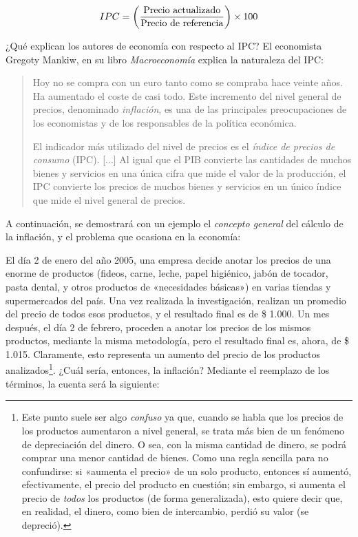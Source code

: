 \documentclass[12pt,a4paper,twoside]{book}
\begin{document}
\begin{equation}
IPC = \left( \dfrac{\text{Precio actualizado}}{\text{Precio de referencia}} \right) \times 100 \\
\end{equation}

¿Qué explican los autores de economía con respecto al IPC? El economista Gregoty Mankiw, en su libro \textit{Macroeconomía} explica la naturaleza del IPC:

\begin{quotation}
Hoy no se compra con un euro tanto como se compraba hace veinte años. Ha aumentado el coste de casi todo. Este incremento del nivel general de precios, denominado \textit{inflación}, es una de las principales preocupaciones de los economistas y de los responsables de la política económica.

El indicador más utilizado del nivel de precios es el \textit{índice de precios de consumo} (IPC). [...] Al igual que el PIB convierte las cantidades de muchos bienes y servicios en una única cifra que mide el valor de la producción, el IPC convierte los precios de muchos bienes y servicios en un único índice que mide el nivel general de precios. \cite[págs. 84-85]{mankiw}
\end{quotation}

A continuación, se demostrará con un ejemplo el \textit{concepto general} del cálculo de la inflación, y el problema que ocasiona en la economía:

El día 2 de enero del año 2005, una empresa decide anotar los precios de una enorme de productos (fideos, carne, leche, papel higiénico, jabón de tocador, pasta dental, y otros productos de «necesidades básicas») en varias tiendas y supermercados del país. Una vez realizada la investigación, realizan un promedio del precio de todos esos productos, y el resultado final es de \$ 1.000. Un mes después, el día 2 de febrero, proceden a anotar los precios de los mismos productos, mediante la misma metodología, pero el resultado final es, ahora, de \$ 1.015. Claramente, esto representa un aumento del precio de los productos analizados\footnote{Este punto suele ser algo \textit{confuso} ya que, cuando se habla que los precios de los productos aumentaron a nivel general, se trata más bien de un fenómeno de depreciación del dinero. O sea, con la misma cantidad de dinero, se podrá comprar una menor cantidad de bienes. Como una regla sencilla para no confundirse: si «aumenta el precio» de un solo producto, entonces sí aumentó, efectivamente, el precio del producto en cuestión; sin embargo, si aumenta el precio de \textit{todos} los productos (de forma generalizada), esto quiere decir que, en realidad, el dinero, como bien de intercambio, perdió su valor (se depreció).}. ¿Cuál sería, entonces, la inflación? Mediante el reemplazo de los términos, la cuenta será la siguiente:
\end{document}
